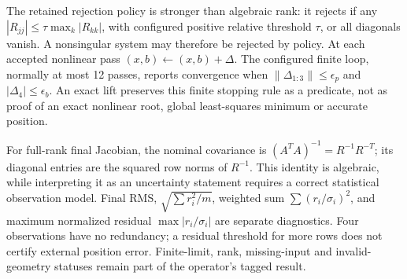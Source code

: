 The retained rejection policy is stronger than algebraic rank: it rejects if
any $|R_{jj}|\le\tau\max_k|R_{kk}|$, with configured positive relative threshold
$\tau$, or all diagonals vanish. A nonsingular system may therefore be rejected
by policy. At each accepted nonlinear pass $(x,b)\leftarrow(x,b)+\Delta$.
The configured finite loop, normally at most 12 passes, reports convergence
when $\|\Delta_{1:3}\|\le\epsilon_p$ and $|\Delta_4|\le\epsilon_b$.
An exact lift preserves this finite stopping rule as a predicate, not as proof
of an exact nonlinear root, global least-squares minimum or accurate position.

For full-rank final Jacobian, the nominal covariance is
$(A^TA)^{-1}=R^{-1}R^{-T}$; its diagonal entries are the squared row norms of
$R^{-1}$. This identity is algebraic, while interpreting it as an uncertainty
statement requires a correct statistical observation model. Final RMS,
$\sqrt{\sum r_i^2/m}$, weighted sum $\sum(r_i/\sigma_i)^2$, and maximum normalized
residual $\max|r_i/\sigma_i|$ are separate diagnostics. Four observations have no
redundancy; a residual threshold for more rows does not certify external
position error. Finite-limit, rank, missing-input and invalid-geometry statuses
remain part of the operator's tagged result.
